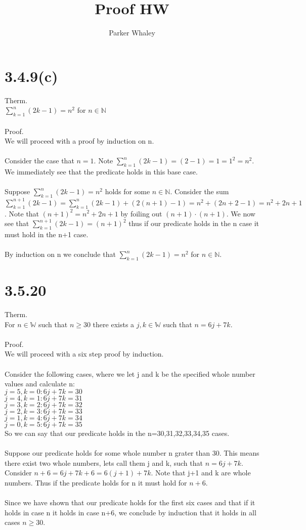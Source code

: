 \documentclass[12pt,a4paper]{article}
\author{Parker Whaley}
\title{Proof HW}
\begin{document}
\maketitle
\section{3.4.9(c)}
Therm.\\
$\sum_{k=1}^n (2k-1)=n^2$ for $n\in \mathbb{N}$\\\\
Proof.\\
We will proceed with a proof by induction on n.\\\\
Consider the case that $n=1$.  Note $\sum_{k=1}^n (2k-1)=(2-1)=1=1^2=n^2$.  We immediately see that the predicate holds in this base case.\\\\
Suppose $\sum_{k=1}^n (2k-1)=n^2$ holds for some $n \in \mathbb{N}$.  Consider the sum $\sum_{k=1}^{n+1} (2k-1)=\sum_{k=1}^{n} (2k-1)+(2(n+1)-1)=n^2+(2n+2-1)=n^2+2n+1$.  Note that $(n+1)^2=n^2+2n+1$ by foiling out $(n+1)\cdot(n+1)$.  We now see that $\sum_{k=1}^{n+1} (2k-1)=(n+1)^2$ thus if our predicate holds in the n case it must hold in the n+1 case.\\\\
By induction on n we conclude that $\sum_{k=1}^n (2k-1)=n^2$ for $n\in \mathbb{N}$.
\section{3.5.20}
Therm.\\
For $n\in \mathbb{W}$ such that $n\ge 30$ there exists a $j,k\in \mathbb{W}$ such that $n=6j+7k$.\\\\
Proof.\\
We will proceed with a six step proof by induction.\\\\
Consider the following cases, where we let j and k be the specified whole number values and calculate n:\\
$j=5,k=0:6j+7k=30$\\
$j=4,k=1:6j+7k=31$\\
$j=3,k=2:6j+7k=32$\\
$j=2,k=3:6j+7k=33$\\
$j=1,k=4:6j+7k=34$\\
$j=0,k=5:6j+7k=35$\\
So we can say that our predicate holds in the n=30,31,32,33,34,35 cases.\\\\
Suppose our predicate holds for some whole number n grater than 30.  This means there exist two whole numbers, lets call them j and k, such that $n=6j+7k$.  Consider $n+6=6j+7k+6=6(j+1)+7k$.  Note that j+1 and k are whole numbers.  Thus if the predicate holds for n it must hold for $n+6$.\\\\
Since we have shown that our predicate holds for the first six cases and that if it holds in case n it holds in case n+6, we conclude by induction that it holds in all cases $n\ge 30$.
\end{document}
